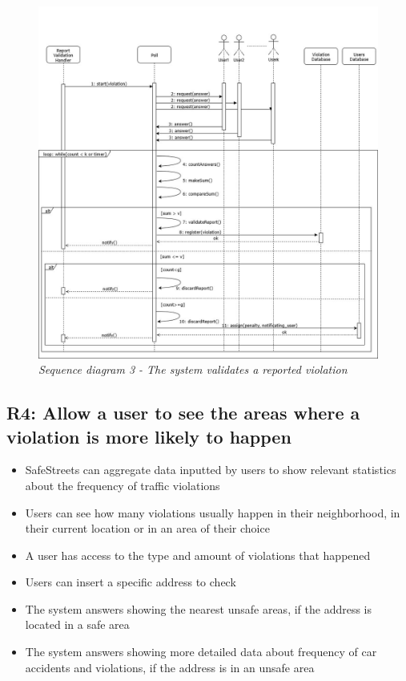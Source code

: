 \begin{figure}[H]
    \centering
    \includegraphics[width=\textwidth]{RASD_Images/SequenceDiagrams/3.jpg}
    \caption{\textit{Sequence diagram 3 - The system validates a reported violation}}
\end{figure}

\subsection{R4: Allow a user to see the areas where a violation is more likely to happen}
\begin{itemize}
    \item SafeStreets can aggregate data inputted by users to show relevant statistics about the frequency of traffic violations
    \item Users can see how many violations usually happen in their neighborhood, in their current location or in an area of their choice
    \item A user has access to the type and amount of violations that happened
    \item Users can insert a specific address to check
    \item The system answers showing the nearest unsafe areas, if the address is located in a safe area
    \item The system answers showing more detailed data about frequency of car accidents and violations, if the address is in an unsafe area
\end{itemize}

